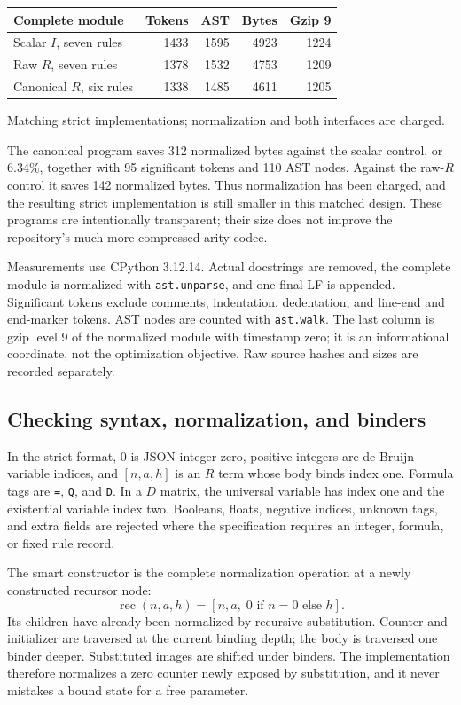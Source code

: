 \documentclass[11pt]{article}
\theoremstyle{definition}
\begin{document}
\begin{center}
\small
\begin{tabular}{lrrrr}
\toprule
Complete module & Tokens & AST & Bytes & Gzip 9\\
\midrule
Scalar $I$, seven rules & 1433 & 1595 & 4923 & 1224\\
Raw $R$, seven rules & 1378 & 1532 & 4753 & 1209\\
Canonical $R$, six rules & 1338 & 1485 & 4611 & 1205\\
\bottomrule
\end{tabular}
\par\smallskip
Matching strict implementations; normalization and both interfaces are charged.
\end{center}


The canonical program saves 312 normalized bytes against the scalar control,
or $6.34\%$, together with 95 significant tokens and 110 AST nodes. Against
the raw-$R$ control it saves 142 normalized bytes. Thus normalization has
been charged, and the resulting strict implementation is still smaller in
this matched design. These programs are intentionally transparent; their
size does not improve the repository's much more compressed arity codec.

Measurements use CPython 3.12.14. Actual docstrings are removed, the complete
module is normalized with \texttt{ast.unparse}, and one final LF is appended.
Significant tokens exclude comments, indentation, dedentation, and line-end
and end-marker tokens. AST nodes are counted with \texttt{ast.walk}.
The last column is gzip level 9 of the normalized module with timestamp zero;
it is an informational coordinate, not the optimization objective. Raw
source hashes and sizes are recorded separately.

\subsection{Checking syntax, normalization, and binders}

In the strict format, $0$ is JSON integer zero, positive integers are
de Bruijn variable indices, and $[n,a,h]$ is an $R$ term whose body binds
index one. Formula tags are \texttt{=}, \texttt{Q}, and \texttt{D}. In a
$D$ matrix, the universal variable has index one and the existential
variable index two. Booleans, floats, negative indices, unknown tags, and
extra fields are rejected where the specification requires an integer,
formula, or fixed rule record.

The smart constructor is the complete normalization operation at a newly
constructed recursor node:
\[
 \operatorname{rec}(n,a,h)=[n,a,\;0\text{ if }n=0\text{ else }h].
\]
Its children have already been normalized by recursive substitution.
Counter and initializer are traversed at the current binding depth; the body
is traversed one binder deeper. Substituted images are shifted under binders.
The implementation therefore normalizes a zero counter newly exposed by
substitution, and it never mistakes a bound state for a free parameter.
\end{document}
